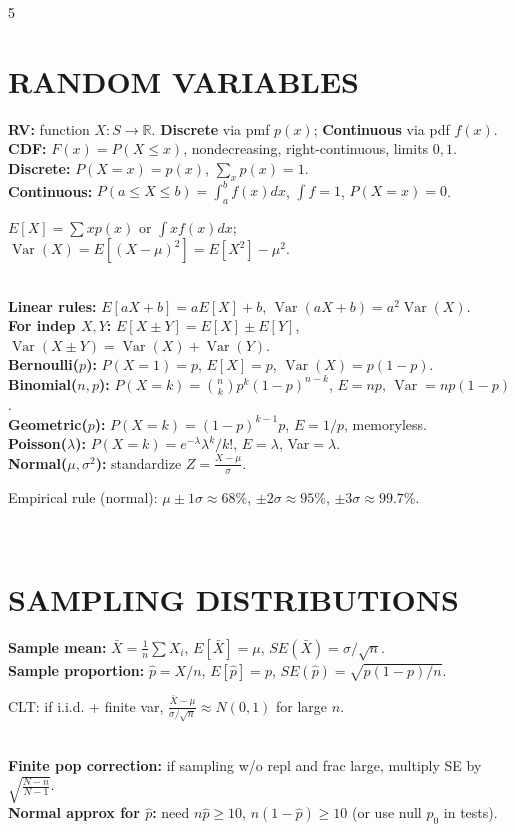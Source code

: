 \documentclass[10pt,landscape,letterpaper]{article}
\newcommand{\concept}[1]{\textcolor{conceptcyan}{\textbf{#1}}}
\newcommand{\process}[1]{\textcolor{processpurple}{\textbf{#1}}}
\newcommand{\category}[1]{\textcolor{categorygreen}{\textbf{#1}}}
\newcommand{\important}[1]{{\setlength{\fboxsep}{1pt}\colorbox{highlightyellow}{\parbox{\dimexpr\linewidth-2\fboxsep\relax}{#1}}}}
\begin{document}
\begin{multicols}{5}
\section{RANDOM VARIABLES}
\concept{RV:} function $X:S\to\mathbb R$. \category{Discrete} via pmf $p(x)$; \category{Continuous} via pdf $f(x)$.\\
\concept{CDF:} $F(x)=P(X\le x)$, nondecreasing, right-continuous, limits $0,1$.\\
\concept{Discrete:} $P(X=x)=p(x)$, $\sum_x p(x)=1$.\\
\concept{Continuous:} $P(a\le X\le b)=\int_a^b f(x)dx$, $\int f=1$, $P(X=x)=0$.\\
\important{$E[X]=\sum x p(x)$ or $\int x f(x)dx$; $\operatorname{Var}(X)=E[(X-\mu)^2]=E[X^2]-\mu^2$.}\\
\concept{Linear rules:} $E[aX+b]=aE[X]+b$, $\operatorname{Var}(aX+b)=a^2\operatorname{Var}(X)$.\\
\concept{For indep $X,Y$:} $E[X\pm Y]=E[X]\pm E[Y]$, $\operatorname{Var}(X\pm Y)=\operatorname{Var}(X)+\operatorname{Var}(Y)$.\\
\category{Bernoulli($p$):} $P(X=1)=p$, $E[X]=p$, $\operatorname{Var}(X)=p(1-p)$.\\
\category{Binomial($n,p$):} $P(X=k)={n\choose k}p^k(1-p)^{n-k}$, $E=np$, $\operatorname{Var}=np(1-p)$.\\
\category{Geometric($p$):} $P(X=k)=(1-p)^{k-1}p$, $E=1/p$, memoryless.\\
\category{Poisson($\lambda$):} $P(X=k)=e^{-\lambda}\lambda^k/k!$, $E=\lambda$, Var$=\lambda$.\\
\category{Normal($\mu,\sigma^2$):} standardize $Z=\frac{X-\mu}{\sigma}$.\\
\important{Empirical rule (normal): $\mu\pm1\sigma\approx68\%$, $\pm2\sigma\approx95\%$, $\pm3\sigma\approx99.7\%$.}\\
\section{SAMPLING DISTRIBUTIONS}
\concept{Sample mean:} $\bar X=\frac1n\sum X_i$, $E[\bar X]=\mu$, $SE(\bar X)=\sigma/\sqrt n$.\\
\concept{Sample proportion:} $\hat p=X/n$, $E[\hat p]=p$, $SE(\hat p)=\sqrt{p(1-p)/n}$.\\
\important{CLT: if i.i.d. + finite var, $\frac{\bar X-\mu}{\sigma/\sqrt n}\approx N(0,1)$ for large $n$.}\\
\concept{Finite pop correction:} if sampling w/o repl and frac large, multiply SE by $\sqrt{\frac{N-n}{N-1}}$.\\
\process{Normal approx for $\hat p$:} need $n\hat p\ge10$, $n(1-\hat p)\ge10$ (or use null $p_0$ in tests).\\

\end{multicols}
\end{document}
